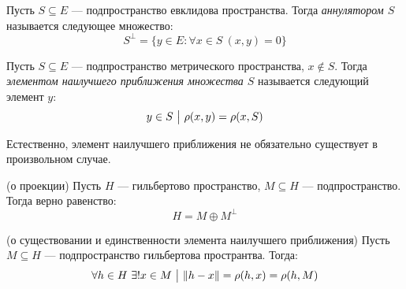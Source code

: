 \begin{definition}
	Пусть $S \subseteq E$ --- подпространство евклидова пространства. Тогда \textit{аннулятором $S$} называется следующее множество:
	\[
		S^\bot = \{y \in E \colon \forall x \in S\ (x, y) = 0\}
	\]
\end{definition}

\begin{definition}
	Пусть $S \subseteq E$ --- подпространство метрического пространства, $x \notin S$. Тогда \textit{элементом наилучшего приближения множества $S$} называется следующий элемент $y$:
	\[
		y \in S \ \big|\  \rho(x, y) = \rho(x, S)
	\]
\end{definition}

\begin{note}
	Естественно, элемент наилучшего приближения не обязательно существует в произвольном случае.
\end{note}

\begin{theorem} (о проекции)
	Пусть $H$ --- гильбертово пространство, $M \subseteq H$ --- подпространство. Тогда верно равенство:
	\[
		H = M \oplus M^\bot
	\]
\end{theorem}

\begin{lemma} (о существовании и единственности элемента наилучшего приближения)
	Пусть $M \subseteq H$ --- подпространство гильбертова пространтва. Тогда:
	\[
		\forall h \in H\ \exists! x \in M \ \big|\  \|h - x\| = \rho(h, x) = \rho(h, M)
	\]
\end{lemma}

